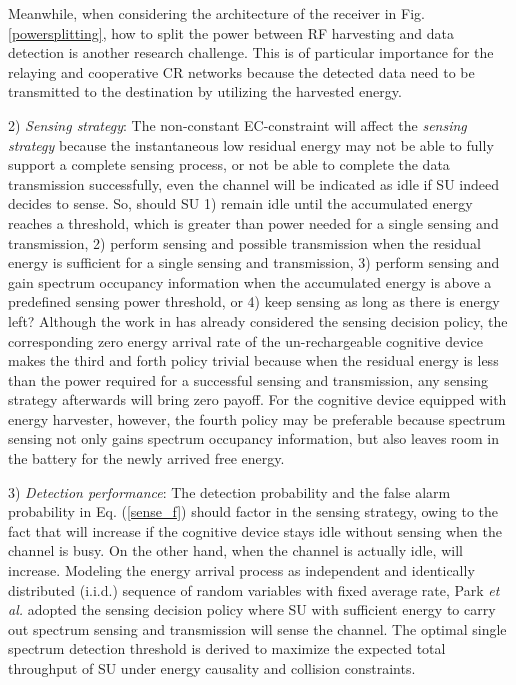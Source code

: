 \documentclass[journal,12pt,onecolumn]{IEEEtran}
\begin{document}
Meanwhile, when considering the architecture of the receiver in Fig. \ref{powersplitting}, how to split the power between RF harvesting and data detection is another research challenge. This is of particular importance for the relaying and cooperative CR networks because the detected data need to be transmitted to the destination by utilizing the harvested energy.


2) \emph{Sensing strategy}: The non-constant EC-constraint will affect the \emph{sensing strategy} because the instantaneous low residual energy may not be able to fully support a complete sensing process, or not be able to complete the data transmission successfully, even the channel will be indicated as idle if SU indeed decides to sense. So, should SU 1) remain idle until the accumulated energy reaches a threshold, which is greater than power needed for a single sensing and transmission, 2) perform sensing and possible transmission when the residual energy is sufficient for a single sensing and transmission, 3) perform sensing and gain spectrum occupancy information when the accumulated energy is above a predefined sensing power threshold, or 4) keep sensing as long as there is energy left? Although the work in \cite{4663925} has already considered the sensing decision policy, the corresponding zero energy arrival rate of the un-rechargeable cognitive device makes the third and forth policy trivial because when the residual energy is less than the power required for a successful sensing and transmission, any sensing strategy afterwards will bring zero payoff. For the cognitive device equipped with energy harvester, however, the fourth policy may be preferable because spectrum sensing not only gains spectrum occupancy information, but also leaves room in the battery for the newly arrived free energy.

3) \emph{Detection performance}: The detection probability and the false alarm probability in Eq. (\ref{sense_f}) should factor in the sensing strategy, owing to the fact that  will increase if the cognitive device stays idle without sensing when the channel is busy. On the other hand, when the channel is actually idle,  will increase. Modeling the energy arrival process as independent and identically distributed (i.i.d.) sequence of random variables with fixed average rate, Park \emph{et al.} \cite{EHoverlayCR} adopted the sensing decision policy where SU with sufficient energy to carry out spectrum sensing and transmission will sense the channel. The optimal single spectrum detection threshold  is derived to maximize the expected total throughput of SU under energy causality and collision constraints.
\end{document}

